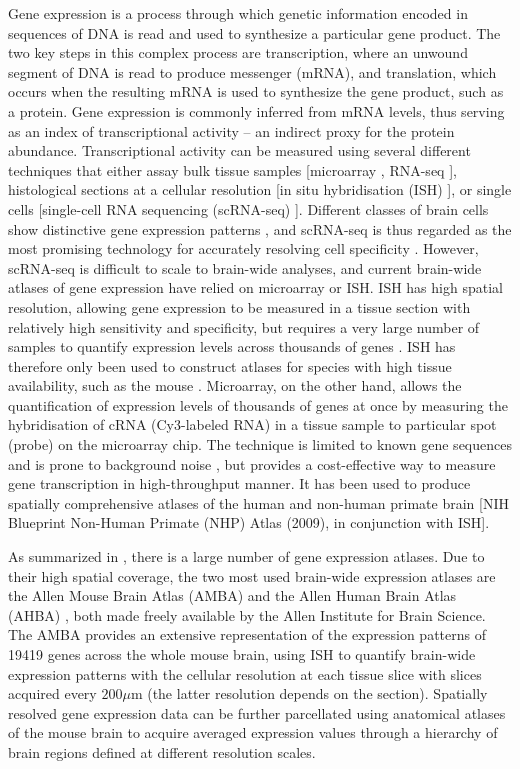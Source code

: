 Gene expression is a process through which genetic information encoded in sequences of DNA is read and used to synthesize a particular gene product.
The two key steps in this complex process are transcription, where an unwound segment of DNA is read to produce messenger (mRNA), and translation, which occurs when the resulting mRNA is used to synthesize the gene product, such as a protein. Gene expression is commonly inferred from mRNA levels, thus serving as an index of transcriptional activity -- an indirect proxy for the protein abundance.
Transcriptional activity can be measured using several different techniques that either assay bulk tissue samples [microarray \citep{Schulze2001}, RNA-seq \citep{Mortazavi2008,Wang2009}], histological sections at a cellular resolution [in situ hybridisation (ISH) \citep{Unger2010}], or single cells [single-cell RNA sequencing (scRNA-seq) \citep{Tang2009}].
Different classes of brain cells show distinctive gene expression patterns \citep{Darmanis2015,Tasic2016,Poulin2016,Mancarci2017}, and scRNA-seq is thus regarded as the most promising technology for accurately resolving cell specificity \citep{Yu2016}.
However, scRNA-seq is difficult to scale to brain-wide analyses, and current brain-wide atlases of gene expression have relied on microarray or ISH.
ISH has high spatial resolution, allowing gene expression to be measured in a tissue section with relatively high sensitivity and specificity, but requires a very large number of samples to quantify expression levels across thousands of genes \citep{Unger2010}.
ISH has therefore only been used to construct atlases for species with high tissue availability, such as the mouse \citep{Lein2007a}.
Microarray, on the other hand, allows the quantification of expression levels of thousands of genes at once by measuring the hybridisation of cRNA (Cy3-labeled RNA) in a tissue sample to particular spot (probe) on the microarray chip.
The technique is limited to known gene sequences and is prone to background noise \citep{Okoniewski2006,Royce2007}, but provides a cost-effective way to measure gene transcription in high-throughput manner. It has been used to produce spatially comprehensive atlases of the human \citep{Kang2011,Hawrylycz2012,Miller2014} and non-human primate brain [NIH Blueprint Non-Human Primate (NHP) Atlas (2009), in conjunction with ISH].

As summarized in \citet{Keil2018}, there is a large number of gene expression atlases.
Due to their high spatial coverage, the two most used brain-wide expression atlases are the Allen Mouse Brain Atlas (AMBA) \citep{Lein2007a} and the Allen Human Brain Atlas (AHBA) \citep{Hawrylycz2012}, both made freely available by the Allen Institute for Brain Science.
The AMBA provides an extensive representation of the expression patterns of \num{19419} genes across the whole mouse brain, using ISH to quantify brain-wide expression patterns with the cellular resolution at each tissue slice with slices acquired every $200\mu$m (the latter resolution depends on the section).
Spatially resolved gene expression data can be further parcellated using anatomical atlases of the mouse brain \citep{Johnson2010,Furth2018} to acquire averaged expression values through a hierarchy of brain regions defined at different resolution scales.


